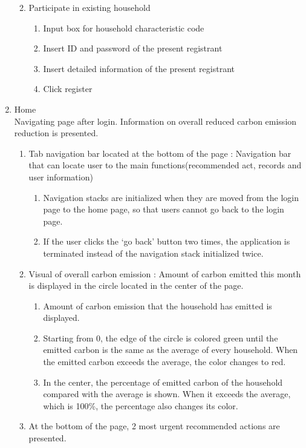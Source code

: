 \documentclass[11pt, conference]{IEEEtran}
\begin{document}
\begin{enumerate}[label=\arabic*]
\begin{enumerate}[label=\alph*]
\begin{enumerate}
        \end{enumerate}
        \item Participate in existing household
        \begin{enumerate}
            \item Input box for household characteristic code
            \item Insert ID and password of the present registrant
            \item Insert detailed information of the present registrant
            \item Click register\\
        \end{enumerate}
    \end{enumerate}
    
    \item {\large{Home}}\\
    Navigating page after login. Information on overall reduced carbon emission reduction is presented.
    \begin{enumerate}[label=\alph*]
        \item Tab navigation bar located at the bottom of the page : Navigation bar that can locate user to the main functions(recommended act, records and user information)
        \begin{enumerate}
            \item Navigation stacks are initialized when they are moved from the login page to the home page, so that users cannot go back to the login page.
            \item If the user clicks the ‘go back’ button two times, the application is terminated instead of the navigation stack initialized twice.
        \end{enumerate}
        \item Visual of overall carbon emission : Amount of carbon emitted this month is displayed in the circle located in the center of the page.
        \begin{enumerate}
            \item Amount of carbon emission that the household has emitted is displayed. 
            \item Starting from 0, the edge of the circle is colored green until the emitted carbon is the same as the average of every household. When the emitted carbon exceeds the average, the color changes to red.
            \item In the center, the percentage of emitted carbon of the household compared with the average is shown. When it exceeds the average, which is 100\%, the percentage also changes its color.
        \end{enumerate}
        \item At the bottom of the page, 2 most urgent recommended actions are presented.\\
    \end{enumerate}
    

\end{enumerate}
\end{document}

